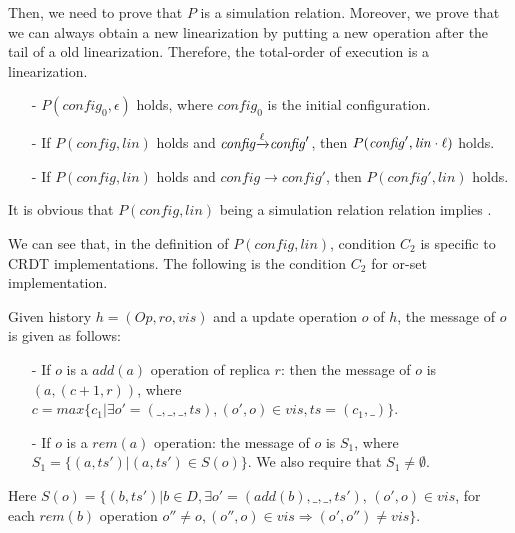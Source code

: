Then, we need to prove that $P$ is a simulation relation. Moreover, we prove that we can always obtain a new linearization by putting a new operation after the tail of a old linearization. Therefore, the total-order of execution is a linearization. 

\begin{itemize}
\setlength{\itemsep}{0.5pt}
\item[-] $P(\mathit{config}_0,\epsilon)$ holds, where $\mathit{config}_0$ is the initial configuration. 

\item[-] If $P(\mathit{config},\mathit{lin})$ holds and $\mathit{config} {\xrightarrow{\ell}} \mathit{config}'$, then $P(\mathit{config}', \mathit{lin} \cdot \ell)$ holds. 

\item[-] If $P(\mathit{config},\mathit{lin})$ holds and $\mathit{config} {\xrightarrow{}} \mathit{config}'$, then $P(\mathit{config}',\mathit{lin})$ holds. 
\end{itemize}

It is obvious that $P(\mathit{config},\mathit{lin})$ being a simulation relation relation implies \crdtlinearizable{}. 

We can see that, in the definition of $P(\mathit{config},\mathit{lin})$, condition $C_2$ is specific to CRDT implementations. The following is the condition $C_2$ for or-set implementation.

\begin{example}
\label{example:condition c2 for or-set implementation}

Given history $h = (\mathit{Op},\mathit{ro},\mathit{vis})$ and a update operation $o$ of $h$, the message of $o$ is given as follows:

\begin{itemize}
\setlength{\itemsep}{0.5pt}
\item[-] If $o$ is a $\mathit{add}(a)$ operation of replica $r$:  then the message of $o$ is $(a,(c+1,r))$, where $c = \mathit{max}\{ c_1 \vert \exists o' = (\_,\_,\_,\mathit{ts}), (o',o) \in \mathit{vis}, \mathit{ts} = (c_1,\_) \}$.

\item[-] If $o$ is a $\mathit{rem}(a)$ operation: the message of $o$ is $S_1$, where $S_1 = \{ (a,\mathit{ts}') \vert (a,\mathit{ts}') \in S(o) \}$. We also require that $S_1 \neq \emptyset$.
\end{itemize}
Here $S(o) = \{ (b,\mathit{ts}') \vert b \in D, \exists o' = (\mathit{add}(b),\_,\_,\mathit{ts}')$, $(o',o) \in \mathit{vis}$, for each $\mathit{rem}(b)$ operation $o'' \neq o, (o'',o) \in \mathit{vis} \Rightarrow (o',o'') \neq \mathit{vis} \}$.
\end{example}

